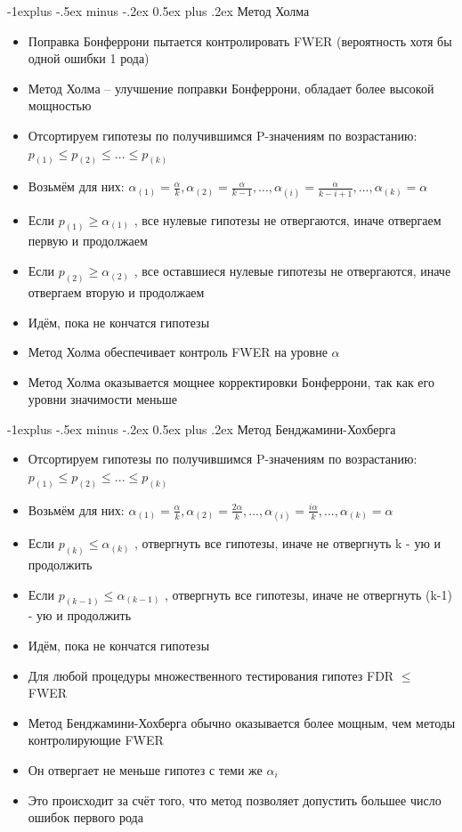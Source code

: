 \documentclass[10pt,landscape]{article}
\makeatletter
\renewcommand{\subsection}{\@startsection{subsection}{2}{0mm}%
                                {-1explus -.5ex minus -.2ex}%
                                {0.5ex plus .2ex}%
                                {\normalfont\normalsize\bfseries}}
\makeatother
\begin{document}
\begin{multicols}{3}
\subsection{Метод Холма}
\begin{itemize}
    \item Поправка Бонферрони пытается контролировать
FWER (вероятность хотя бы одной ошибки 1 рода)
    \item Метод Холма – улучшение поправки Бонферрони,
обладает более высокой мощностью 
    \item Отсортируем гипотезы по получившимся P-значениям по возрастанию: $p_{(1)} \leq p_{(2)} \leq ... \leq p_{(k)}$
    \item Возьмём для них: $\alpha_{(1)} = \frac{\alpha}{k}, \alpha_{(2)} = \frac{\alpha}{k-1}, ..., \alpha_{(i)} = \frac{\alpha}{k-i+1}, ..., \alpha_{(k)} = \alpha$
    \item Если $p_{(1)} \geq \alpha_{(1)}$ , все нулевые гипотезы не отвергаются, иначе отвергаем первую и продолжаем
    \item Если $p_{(2)} \geq \alpha_{(2)}$ , все оставшиеся нулевые гипотезы не отвергаются, иначе отвергаем вторую и продолжаем
    \item Идём, пока не кончатся гипотезы
    \item Метод Холма обеспечивает контроль FWER на уровне $\alpha$
    \item Метод Холма оказывается мощнее корректировки
Бонферрони, так как его уровни значимости меньше
\end{itemize}
\subsection{Метод Бенджамини-Хохберга}
\begin{itemize}
    \item Отсортируем гипотезы по получившимся P-значениям по возрастанию: $p_{(1)} \leq p_{(2)} \leq ... \leq p_{(k)}$
    \item Возьмём для них: $\alpha_{(1)} = \frac{\alpha}{k}, \alpha_{(2)} = \frac{2\alpha}{k}, ..., \alpha_{(i)} = \frac{i\alpha}{k}, ..., \alpha_{(k)} = \alpha$
    \item Если $p_{(k)} \leq \alpha_{(k)}$ , отвергнуть все гипотезы, иначе не отвергнуть k - ую и продолжить
    \item Если $p_{(k-1)} \leq \alpha_{(k-1)}$ , отвергнуть все гипотезы, иначе не отвергнуть (k-1) - ую и продолжить
    \item Идём, пока не кончатся гипотезы
    \item Для любой процедуры множественного тестирования
    гипотез FDR $\leq$ FWER
    \item Метод Бенджамини-Хохберга обычно оказывается более мощным, чем методы контролирующие FWER
    \item Он отвергает не меньше гипотез с теми же $\alpha_i$
    \item Это происходит за счёт того, что метод позволяет
    допустить большее число ошибок первого рода
\end{itemize}

\end{multicols}
\end{document}
